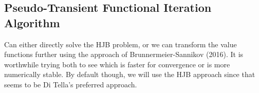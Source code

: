 \documentclass[12 pt, oneside]{article}
\theoremstyle{definition}
\theoremstyle{definition}
\theoremstyle{definition}
\begin{document}
\subsection{Pseudo-Transient Functional Iteration Algorithm}



Can either directly solve the HJB problem, or we can transform the value functions further using the approach of Brunnermeier-Sannikov (2016). It is worthwhile trying both to see which is faster for convergence or is more numerically stable. By default though, we will use the HJB approach since that seems to be Di Tella's preferred approach.
\end{document}
